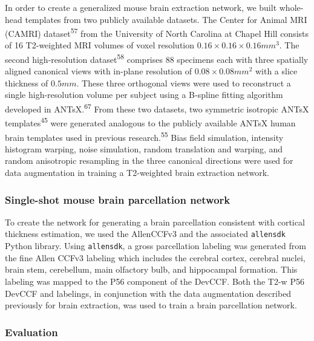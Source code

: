 \documentclass[
  12pt,
]{article}
\begin{document}
In order to create a generalized mouse brain extraction network, we
built whole-head templates from two publicly available datasets. The
Center for Animal MRI (CAMRI) dataset\textsuperscript{57} from the
University of North Carolina at Chapel Hill consists of 16 T2-weighted
MRI volumes of voxel resolution \(0.16 \times 0.16 \times 0.16 mm^3\).
The second high-resolution dataset\textsuperscript{58} comprises 88
specimens each with three spatially aligned canonical views with
in-plane resolution of \(0.08 \times 0.08 mm^2\) with a slice thickness
of \(0.5 mm\). These three orthogonal views were used to reconstruct a
single high-resolution volume per subject using a B-spline fitting
algorithm developed in ANTsX.\textsuperscript{67} From these two
datasets, two symmetric isotropic ANTsX templates\textsuperscript{45}
were generated analogous to the publicly available ANTsX human brain
templates used in previous research.\textsuperscript{55} Bias field
simulation, intensity histogram warping, noise simulation, random
translation and warping, and random anisotropic resampling in the three
canonical directions were used for data augmentation in training a
T2-weighted brain extraction network.

\hypertarget{single-shot-mouse-brain-parcellation-network}{%
\subsubsection{Single-shot mouse brain parcellation
network}\label{single-shot-mouse-brain-parcellation-network}}

To create the network for generating a brain parcellation consistent
with cortical thickness estimation, we used the AllenCCFv3 and the
associated \texttt{allensdk} Python library. Using \texttt{allensdk}, a
gross parcellation labeling was generated from the fine Allen CCFv3
labeling which includes the cerebral cortex, cerebral nuclei, brain
stem, cerebellum, main olfactory bulb, and hippocampal formation. This
labeling was mapped to the P56 component of the DevCCF. Both the T2-w
P56 DevCCF and labelings, in conjunction with the data augmentation
described previously for brain extraction, was used to train a brain
parcellation network.

\hypertarget{evaluation}{%
\subsubsection{Evaluation}\label{evaluation}}
\end{document}
